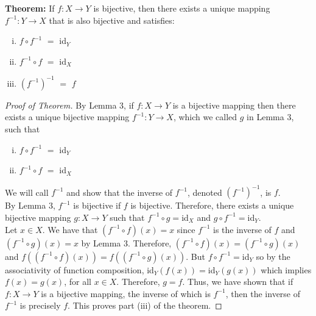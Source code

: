 \documentclass[]{book}
\begin{document}
{\bf Theorem:} If $f:X\to Y$ is bijective, then there exists a unique mapping $f^{-1}:Y\to X$ that is also bijective and satisfies:
\begin{enumerate}[(i)]
\item $f \circ f^{-1}$ $=$ id$_Y$
\item $f^{-1} \circ f$ $=$ id$_X$
\item $(f^{-1})^{-1}$ $=$ $f$
\end{enumerate}
\begin{proof}[Proof of Theorem]
By Lemma 3, if $f:X\to Y$ is a bijective mapping then there exists a unique bijective mapping $f^{-1}:Y\to X$, which we called $g$ in Lemma 3, such that
\begin{enumerate}[(i)]
\item $f \circ f^{-1}$ $=$ id$_Y$
\item $f^{-1} \circ f$ $=$ id$_X$
\end{enumerate}
We will call $f^{-1}$  and show that the inverse of $f^{-1}$,  denoted $(f^{-1})^{-1}$, is $f$. \\
By Lemma 3,  $f^{-1}$ is bijective if $f$ is bijective. Therefore, there exists a unique bijective mapping $g:X\to Y$ such that $f^{-1}\circ g=$id$_X$ and $g\circ f^{-1}=$id$_Y$. \\
Let $x\in X$. We have that $(f^{-1}\circ f)(x)=x$ since $f^{-1}$ is the inverse of $f$ and $(f^{-1}\circ g)(x)=x$ by Lemma 3. Therefore, $(f^{-1}\circ f)(x)=(f^{-1}\circ g)(x)$ and $f((f^{-1}\circ f)(x))=f((f^{-1}\circ g)(x))$. But $f\circ f^{-1}=$id$_Y$ so by the associativity of function composition, id$_Y(f(x))=$id$_Y(g(x))$ which implies $f(x)=g(x)$, for all $x\in X$. Therefore, $g=f$.
Thus, we have shown that if $f:X\to Y$ is a bijective mapping, the inverse of which is $f^{-1}$, then the inverse of $f^{-1}$ is precisely $f$. This proves part (iii) of the theorem.
\end{proof}
\end{document}
